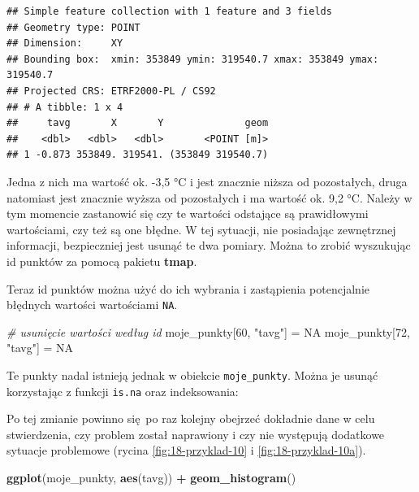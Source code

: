 \documentclass[
  paper=6in:9in,pagesize=pdftex,headinclude=on,footinclude=on,10pt]{scrbook}
\newenvironment{Shaded}{\begin{snugshade}}{\end{snugshade}}
\newcommand{\CommentTok}[1]{\textcolor[rgb]{0.56,0.35,0.01}{\textit{#1}}}
\newcommand{\ConstantTok}[1]{\textcolor[rgb]{0.56,0.35,0.01}{#1}}
\newcommand{\DecValTok}[1]{\textcolor[rgb]{0.00,0.00,0.81}{#1}}
\newcommand{\FunctionTok}[1]{\textcolor[rgb]{0.13,0.29,0.53}{\textbf{#1}}}
\newcommand{\NormalTok}[1]{#1}
\newcommand{\OtherTok}[1]{\textcolor[rgb]{0.56,0.35,0.01}{#1}}
\newcommand{\SpecialCharTok}[1]{\textcolor[rgb]{0.81,0.36,0.00}{\textbf{#1}}}
\newcommand{\StringTok}[1]{\textcolor[rgb]{0.31,0.60,0.02}{#1}}
\begin{document}
\begin{verbatim}
## Simple feature collection with 1 feature and 3 fields
## Geometry type: POINT
## Dimension:     XY
## Bounding box:  xmin: 353849 ymin: 319540.7 xmax: 353849 ymax: 319540.7
## Projected CRS: ETRF2000-PL / CS92
## # A tibble: 1 x 4
##     tavg       X       Y              geom
##    <dbl>   <dbl>   <dbl>       <POINT [m]>
## 1 -0.873 353849. 319541. (353849 319540.7)
\end{verbatim}

Jedna z nich ma wartość ok. -3,5 °C i jest znacznie niższa od pozostałych, druga natomiast jest znacznie wyższa od pozostałych i ma wartość ok. 9,2 °C.
Należy w tym momencie zastanowić się czy te wartości odstające są prawidłowymi wartościami, czy też są one błędne.
W tej sytuacji, nie posiadając zewnętrznej informacji, bezpieczniej jest usunąć te dwa pomiary.
Można to zrobić wyszukując id punktów za pomocą pakietu \textbf{tmap}.

Teraz id punktów można użyć do ich wybrania i zastąpienia potencjalnie błędnych wartości wartościami \texttt{NA}.

\begin{Shaded}
\begin{Highlighting}[]
\CommentTok{\# usunięcie wartości według id}
\NormalTok{moje\_punkty[}\DecValTok{60}\NormalTok{, }\StringTok{"tavg"}\NormalTok{] }\OtherTok{=} \ConstantTok{NA}
\NormalTok{moje\_punkty[}\DecValTok{72}\NormalTok{, }\StringTok{"tavg"}\NormalTok{] }\OtherTok{=} \ConstantTok{NA}
\end{Highlighting}
\end{Shaded}

Te punkty nadal istnieją jednak w obiekcie \texttt{moje\_punkty}.
Można je usunąć korzystając z funkcji \texttt{is.na} oraz indeksowania:

\begin{Shaded}
\end{Shaded}

Po tej zmianie powinno się~po raz kolejny obejrzeć dokładnie dane w celu stwierdzenia, czy problem został naprawiony i czy nie występują dodatkowe sytuacje problemowe (rycina \ref{fig:18-przyklad-10} i \ref{fig:18-przyklad-10a}).

\begin{Shaded}
\begin{Highlighting}[]
\FunctionTok{ggplot}\NormalTok{(moje\_punkty, }\FunctionTok{aes}\NormalTok{(tavg)) }\SpecialCharTok{+} \FunctionTok{geom\_histogram}\NormalTok{()}
\end{Highlighting}
\end{Shaded}
\end{document}
